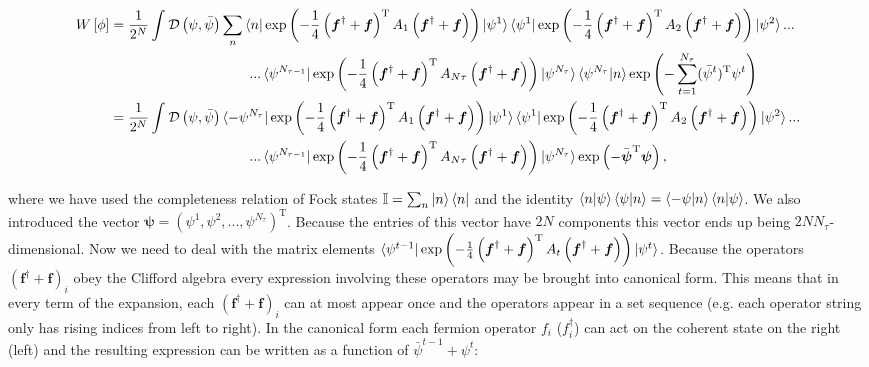 \documentclass{article}
\begin{document}
	\begin{align}
		W\left[ \phi \right] &= \frac{1}{2^N}\int_{ }^{ } \mathcal{D}\left({\psi},\bar{\psi}\right)\sum_{n}^{ }\bra{n} \exp{\left(-\frac{1}{4}\left(\boldsymbol{f}^\dagger + \boldsymbol{f}\right)^\mathrm{T}  A_1 \left(\boldsymbol{f}^\dagger + \boldsymbol{f}\right)\right)}\ket{\psi^1} \bra{\psi^1}\exp{\left(-\frac{1}{4}\left(\boldsymbol{f}^\dagger + \boldsymbol{f}\right)^\mathrm{T}  A_2 \left(\boldsymbol{f}^\dagger + \boldsymbol{f}\right)\right)}\ket{\psi^2}...\nonumber\\
		&\quad \quad \quad \quad \quad \quad\quad \quad \quad \quad...\bra{\psi^{N_{\tau-1}}}\exp{\left(-\frac{1}{4}\left(\boldsymbol{f}^\dagger + \boldsymbol{f}\right)^\mathrm{T}  A_{N\tau} \left(\boldsymbol{f}^\dagger + \boldsymbol{f}\right)\right)}\ket{\psi^{N_\tau}}\braket{\psi^{N_\tau}|n} \exp \left( - \sum_{t=1}^{N_\tau}(\bar{\psi}^t)^\mathrm{T}  \psi^t   \right) \nonumber \\
		&= \frac{1}{2^N}\int_{ }^{ } \mathcal{D}\left({\psi},\bar{\psi}\right)\bra{-\psi ^{N_\tau}}\exp{\left(-\frac{1}{4}\left(\boldsymbol{f}^\dagger + \boldsymbol{f}\right)^\mathrm{T}  A_1 \left(\boldsymbol{f}^\dagger + \boldsymbol{f}\right)\right)}\ket{\psi^1} \bra{\psi^1}\exp{\left(-\frac{1}{4}\left(\boldsymbol{f}^\dagger + \boldsymbol{f}\right)^\mathrm{T}  A_2 \left(\boldsymbol{f}^\dagger + \boldsymbol{f}\right)\right)}\ket{\psi^2}...\nonumber\\
		&\quad\quad\quad\quad\quad\quad\quad\quad\quad\quad...\bra{\psi^{N_{\tau-1}}}\exp{\left(-\frac{1}{4}\left(\boldsymbol{f}^\dagger + \boldsymbol{f}\right)^\mathrm{T}  A_{N\tau} \left(\boldsymbol{f}^\dagger + \boldsymbol{f}\right)\right)}\ket{\psi^{N_\tau}} \exp \left( - \bar{\boldsymbol{\psi}}^\mathrm{T} \boldsymbol{\psi}\right),
	\end{align}
	
	where we have used the completeness relation of Fock states $\mathbb{I} = \sum_{n}^{ }\ket{n} \bra{n}$ and the identity $\braket{n | \psi} \braket{\psi|n} = \braket{-\psi|n}\braket{n|\psi}$. We also introduced the vector $\boldsymbol{ \psi} = \left(\psi^1, \psi^2, ..., \psi^{N_\tau}\right)^\mathrm{T}$. Because the entries of this vector have $2N$ components this vector ends up being $2NN_{\tau}$-dimensional. Now we need to deal with the matrix elements $\bra{\psi^{t-1}}\exp{\left(-\frac{1}{4}\left(\boldsymbol{f}^\dagger + \boldsymbol{f}\right)^\mathrm{T}  A_{t} \left(\boldsymbol{f}^\dagger + \boldsymbol{f}\right)\right)}\ket{\psi^{t}}$. Because the operators $\left(\boldsymbol{f}^\dagger + \boldsymbol{f}\right)_i$ obey the Clifford algebra every expression involving these operators may be brought into canonical form. This means that in every term of the expansion, each $\left(\boldsymbol{f}^\dagger + \boldsymbol{f}\right)_i$ can at most appear once and the operators appear in a set sequence (e.g. each operator string only has rising indices from left to right). In the canonical form each fermion operator $f_{i}$ ($f_{i}^{\dagger} $) can act on the coherent state on the right (left) and the resulting expression can be written as a function of $\bar{\psi}^{t-1} + \psi^t$:
	
\end{document}
